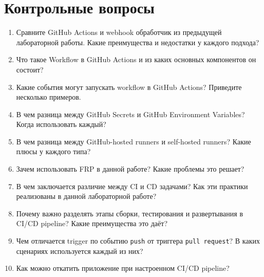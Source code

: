\documentclass[12pt,a4paper]{article}
\begin{document}
\section{Контрольные вопросы}
\begin{enumerate}
    \item Сравните GitHub Actions и webhook обработчик из предыдущей лабораторной работы. Какие преимущества и недостатки у каждого подхода?
    \item Что такое Workflow в GitHub Actions и из каких основных компонентов он состоит?
    \item Какие события могут запускать workflow в GitHub Actions? Приведите несколько примеров.
    \item В чем разница между GitHub Secrets и GitHub Environment Variables? Когда использовать каждый?
    \item В чем разница между GitHub-hosted runners и self-hosted runners? Какие плюсы у каждого типа?
    \item Зачем использовать FRP в данной работе? Какие проблемы это решает?
    \item В чем заключается различие между CI и CD задачами? Как эти практики реализованы в данной лабораторной работе?
    \item Почему важно разделять этапы сборки, тестирования и развертывания в CI/CD pipeline? Какие преимущества это даёт?
    \item Чем отличается trigger по событию \texttt{push} от триггера \texttt{pull request}?
    В каких сценариях используется каждый из них?
    \item Как можно откатить приложение при настроенном CI/CD pipeline?
\end{enumerate}
\end{document}
